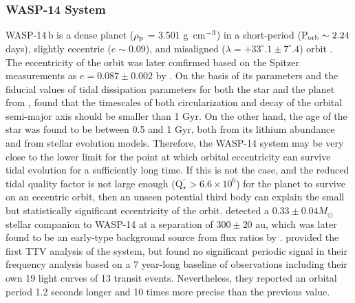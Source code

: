 \documentclass[a4paper,fleqn,usenatbib]{mnras}
\begin{document}
\subsubsection{WASP-14 System}
WASP-14\,b is a dense planet ($\rho_{\rm p}$ = 3.501 g~cm$^{\rm -3}$) in a short-period (P$_{\rm orb} \sim 2.24$ days), slightly eccentric ($e \sim 0.09$), and misaligned ($\lambda = +33^{\circ}.1 \pm 7^{\circ}.4$) orbit \citep{2009MNRAS.392.1532J}. The eccentricity of the orbit was later confirmed based on the Spitzer measurements as $e = 0.087 \pm 0.002$ by \cite{2013ApJ...779....5B}. On the basis of its parameters and the fiducial values of tidal dissipation parameters for both the star and the planet from \citet{2008ApJ...678.1396J}, \citet{2009MNRAS.392.1532J} found that the timescales of both circularization and decay of the orbital semi-major axis should be smaller than 1 Gyr. On the other hand, the age of the star was found to be between 0.5 and 1 Gyr, both from its lithium abundance and from stellar evolution models. Therefore, the WASP-14 system may be very close to the lower limit for the point at which orbital eccentricity can survive tidal evolution for a sufficiently long time. If this is not the case, and the reduced tidal quality factor is not large enough (Q$^{\prime}_{\star} > 6.6 \times 10^6$) for the planet to survive on an eccentric orbit, then an unseen potential third body can explain the small but statistically significant eccentricity of the orbit. \cite{2015ApJ...800..138N} detected a $0.33 \pm 0.04 M_{\odot}$ stellar companion to WASP-14 at a separation of $300 \pm 20$ au, which was later found to be an early-type background source from flux ratios by \cite{2015A&A...575A..23W}. \cite{2015MNRAS.451.4139R} provided the first TTV analysis of the system, but found no significant periodic signal in their frequency analysis based on a 7 year-long baseline of observations including their own 19 light curves of 13 transit events. Nevertheless, they reported an orbital period 1.2 seconds longer and 10 times more precise than the previous value.
\end{document}
